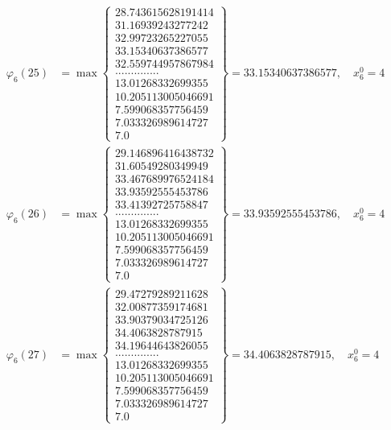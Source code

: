 \documentclass{article}
\begin{document}
\begin{align*}
  
  
  
\varphi_{6}(25) &= \max \left\{ \begin{array}{c}
28.743615628191414 \\
 31.16939243277242 \\
 32.99723265227055 \\
 33.15340637386577 \\
 32.559744957867984 \\
 .............. \\
 13.01268332699355 \\
 10.205113005046691 \\
 7.599068357756459 \\
 7.033326989614727 \\
 7.0
\end{array} \right\} = 33.15340637386577, \quad x_{6}^0 = 4\\
  
  
  
  
\varphi_{6}(26) &= \max \left\{ \begin{array}{c}
29.146896416438732 \\
 31.60549280349949 \\
 33.467689976524184 \\
 33.93592555453786 \\
 33.41392725758847 \\
 .............. \\
 13.01268332699355 \\
 10.205113005046691 \\
 7.599068357756459 \\
 7.033326989614727 \\
 7.0
\end{array} \right\} = 33.93592555453786, \quad x_{6}^0 = 4\\
  
  
  
  
\varphi_{6}(27) &= \max \left\{ \begin{array}{c}
29.47279289211628 \\
 32.00877359174681 \\
 33.90379034725126 \\
 34.4063828787915 \\
 34.19644643826055 \\
 .............. \\
 13.01268332699355 \\
 10.205113005046691 \\
 7.599068357756459 \\
 7.033326989614727 \\
 7.0
\end{array} \right\} = 34.4063828787915, \quad x_{6}^0 = 4\\
  

\end{align*}
\end{document}

